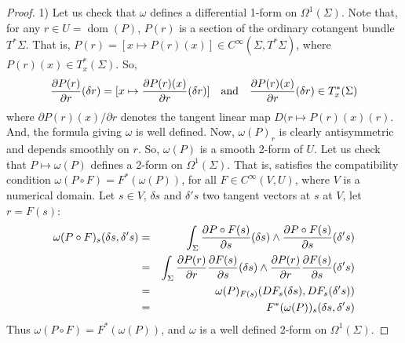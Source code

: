 \documentclass[10pt,reqno,twoside]{amsart}
\DeclareMathOperator{\dom}{dom}
\newcommand{\Cinfty}{C^\infty}
\newcommand{\D}{D}
\newcommand{\T}{T}
\theoremstyle{plain}
\theoremstyle{definition}
\begin{document}
  \begin{proof}
    1) Let us check that $\omega$ defines a differential 1-form on $\Omega^1(\Sigma)$.
    Note that,
    for any $r \in U = \dom(P)$,
    $P (r)$ is a section of the ordinary cotangent bundle $\T^*\Sigma$.
    That is,
    $P (r) = [x \mapsto P (r)(x)] \in \Cinfty(\Sigma,\T^*\Sigma)$,
    where $P (r)(x) \in \T_x^*(\Sigma)$.
    So,
    $$
      {\partial P (r) \over \partial r}(\delta r) = [x \mapsto {\partial P (r)(x) \over \partial r}(\delta r)] \quad \mbox{and} \quad {\partial P (r) (x) \over \partial r}(\delta r) \in {\T}^{*}_{x}(\Sigma)
      $$
    where $\partial P (r)(x) / \partial r$ denotes the tangent linear map $\D(r \mapsto P (r)(x)(r)$.
    And,
    the formula giving $\omega$ is well defined.
    Now,
    $\omega(P)_r$ is clearly antisymmetric and depends smoothly on $r$.
    So,
    $\omega(P)$ is a smooth 2-form of ${U}$.
    Let us check that $P \mapsto \omega(P)$ defines a 2-form on $\Omega^1(\Sigma)$.
    That is,
    satisfies the compatibility condition $\omega(P \circ F) = F^*(\omega(P))$,
    for all $F \in \Cinfty(V, U)$,
    where $V$ is a numerical domain.
    Let $s \in {V}$,
    $\delta s$ and $\delta' s$ two tangent vectors at $s$ at ${V}$,
    let $r = F(s)$:
    \begin{eqnarray*}
      \omega(P \circ F)_s(\delta s,\delta' s) & = & \int_\Sigma {\partial P \circ F(s) \over \partial s}(\delta s)\wedge {\partial P \circ F(s) \over \partial s}(\delta' s) \\
      & = & \int_\Sigma {\partial P (r) \over \partial r}{\partial F(s) \over \partial s}(\delta s)\wedge {\partial P (r) \over \partial r}{\partial F(s) \over \partial s}(\delta' s) \\
      & = & \omega(P)_{F(s)}(\D F_s(\delta s),\D F_s(\delta' s)) \\
      & = & {F}^*(\omega(P))_s(\delta s,\delta' s)
    \end{eqnarray*}
    Thus $\omega(P \circ F) = F^*(\omega(P))$,
    and $\omega$ is a well defined 2-form on $\Omega^1(\Sigma)$.
    

\end{proof}
\end{document}
